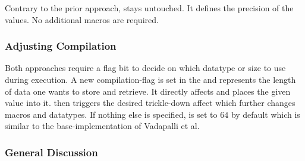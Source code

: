 Contrary to the prior approach,  stays untouched.
It defines the precision of the  values.
No additional macros are required.

\subsubsection*{Adjusting Compilation}\label{subsub:adjustingCompilation}
Both approaches require a flag bit to decide on which datatype or size to use during execution.
A new compilation-flag  is set in the  and represents the length of data one wants to store and retrieve.
It directly affects  and places the given value into it.
 then triggers the desired trickle-down affect which further changes macros and datatypes.
If nothing else is specified,  is set to $64$ by default which is similar to the base-implementation of Vadapalli et al.

\subsubsection*{General Discussion}